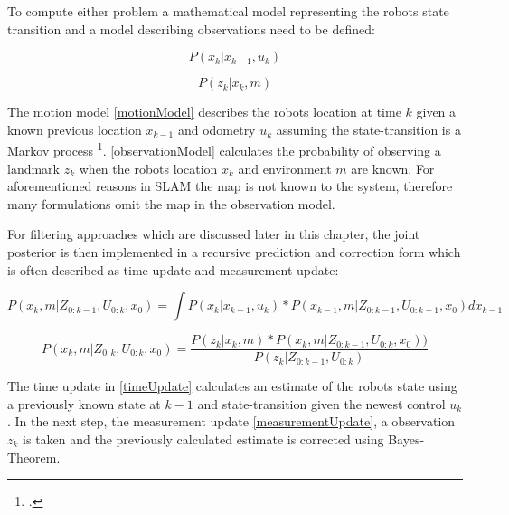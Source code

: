 To compute either problem a mathematical model representing the robots state transition and a model describing observations need to be defined:

\begin{equation}\label{motionModel}
	P(x_{k} | x_{k-1}, u_{k})
\end{equation}

\begin{equation}\label{observationModel}
	P(z_{k} | x_{k}, m)
\end{equation}

The motion model \ref{motionModel} describes the robots location at time $ k $ given a known previous location $ x_{k-1} $ and odometry $ u_{k} $ assuming the state-transition is a Markov process \footcite{haeneltMarvoModel2006}.
\ref{observationModel} calculates the probability of observing a landmark $ z_{k} $ when the robots location $ x_{k} $ and environment $ m $ are known. For aforementioned reasons in SLAM the map is not known to the system, therefore many formulations omit the map in the observation model.


For filtering approaches which are discussed later in this chapter, the joint posterior is then implemented in a recursive prediction and correction form which is often described as time-update and measurement-update:

\begin{equation}\label{timeUpdate}
	P(x_{k}, m | Z_{0:k-1}, U_{0:k}, x_{0}) = \int P(x_{k} | x_{k-1}, u_{k}) * P(x_{k-1}, m | Z_{0:k-1}, U_{0:k-1}, x_{0}) dx_{k-1}
\end{equation}


\begin{equation}\label{measurementUpdate}
	P(x_{k}, m | Z_{0:k}, U_{0:k}, x_{0}) = \frac{P(z_{k} | x_{k}, m) * P(x_{k}, m | Z_{0:k-1}, U_{0:k}, x_{0}))}{P(z_{k} | Z_{0:k-1}, U_{0:k})}
\end{equation}

The time update in \ref{timeUpdate} calculates an estimate of the robots state using a previously known state at $ k - 1 $ and state-transition given the newest control $ u_{k} $.
In the next step, the measurement update \ref{measurementUpdate}, a observation $z_{k} $ is taken and the previously calculated estimate is corrected using Bayes-Theorem. 

